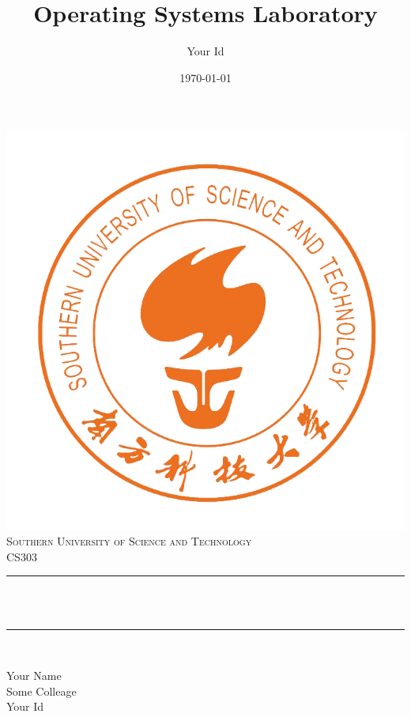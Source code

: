 \documentclass[12pt]{article}
\title{Operating Systems Laboratory}                                %
\author{Your Id}                               %
\date{\today}                                         %
\makeatletter
\let\thetitle\@title
\makeatother
\begin{document}

\begin{titlepage}
    \centering
    \vspace*{0.5 cm}
    \includegraphics[scale = 0.75]{logo.png}\\[1.0 cm]  %
    \textsc{\LARGE Southern University of Science \newline\newline and Technology}\\[2.0 cm]  %
    \textsc{\Large CS303}\\[0.5 cm]               %
    \rule{\linewidth}{0.2 mm} \\[0.4 cm]
    { \huge \bfseries \thetitle}\\
    \rule{\linewidth}{0.2 mm} \\[1.5 cm]

    \begin{minipage}{0.4\textwidth}

      \begin{centering} \large
        Your Name\\
        Some Colleage\\
        Your Id\\
      \end{centering}
    \end{minipage}\\[2 cm]

\end{titlepage}
\end{document}
